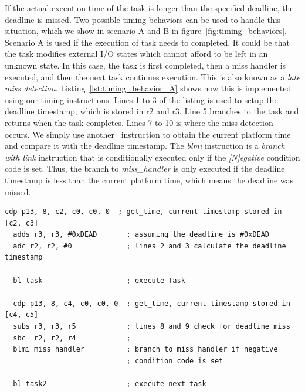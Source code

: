 If the actual execution time of the task is longer than the specified deadline, the deadline is missed. 
Two possible timing behaviors can be used to handle this situation, which we show in scenario A and B in figure~\ref{fig:timing_behaviors}. 
Scenario A is used if the execution of task needs to completed. 
It could be that the task modifies external I/O states which cannot afford to be left in an unknown state.
In this case, the task is first completed, then a miss handler is executed, and then the next task continues execution.
This is also known as a \emph{late miss detection}.  
Listing~\ref{lst:timing_behavior_A} shows how this is implemented using our timing instructions.
Lines 1 to 3 of the listing is used to setup the deadline timestamp, which is stored in r2 and r3.  
Line 5 branches to the task and returns when the task completes.
Lines 7 to 10 is where the miss detection occurs. 
We simply use another \gettime\ instruction to obtain the current platform time and compare it with the deadline timestamp.
The \emph{blmi} instruction is a \emph{branch with link} instruction that is conditionally executed only if the \emph{[N]egative} condition code is set.
Thus, the branch to \emph{miss\_handler} is only executed if the deadline timestamp is less than the current platform time, which means the deadline was missed.
\vspace{-5mm}
\begin{lstlisting}[float=h, label=lst:timing_behavior_A,caption=Assembly code to implement scenario A]
  cdp p13, 8, c2, c0, c0, 0  ; get_time, current timestamp stored in [c2, c3]
  adds r3, r3, #0xDEAD       ; assuming the deadline is #0xDEAD
  adc r2, r2, #0             ; lines 2 and 3 calculate the deadline timestamp
   
  bl task                    ; execute Task
  
  cdp p13, 8, c4, c0, c0, 0  ; get_time, current timestamp stored in [c4, c5]
  subs r3, r3, r5            ; lines 8 and 9 check for deadline miss
  sbc  r2, r2, r4            ; 
  blmi miss_handler          ; branch to miss_handler if negative 
                             ; condition code is set
     
  bl task2                   ; execute next task
\end{lstlisting}
\vspace{-2mm} 

